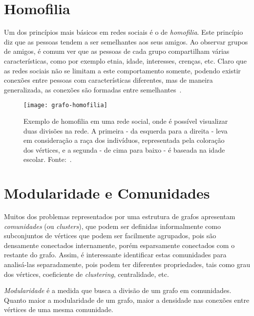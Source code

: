 \section{Homofilia}
\label{conceitos__homofilia}

Um dos princípios mais básicos em redes sociais é o de \emph{homofilia}. Este princípio diz que as pessoas tendem a ser semelhantes aos seus amigos. Ao observar grupos de amigos, é comum ver que as pessoas de cada grupo compartilham várias características, como por exemplo etnia, idade, interesses, crenças, etc. Claro que as redes sociais não se limitam a este comportamento somente, podendo existir conexões entre pessoas com características diferentes, mas de maneira generalizada, as conexões são formadas entre semelhantes~\cite{easley2010networks}.

\begin{figure}[H]
\texttt{[image: grafo-homofilia]}
\centering
\caption{
     Exemplo de homofilia em uma rede social, onde é possível visualizar duas divisões na rede. A primeira - da esquerda para a direita - leva em consideração a raça dos indivíduos, representada pela coloração dos vértices, e a segunda - de cima para baixo - é baseada na idade escolar. Fonte:~\cite{moody2001race}.
}
\label{fig:grafo-homofilia}
\end{figure}

\section{Modularidade e Comunidades}
\label{conceitos__modularidade}

Muitos dos problemas representados por uma estrutura de grafos apresentam \emph{comunidades} (ou \emph{clusters}), que podem ser definidas informalmente como subconjuntos de vértices que podem ser facilmente agrupados, pois são densamente conectados internamente, porém esparsamente conectados com o restante do grafo. Assim, é interessante identificar estas comunidades para analisá-las separadamente, pois podem ter diferentes propriedades, tais como grau dos vértices, coeficiente de \emph{clustering}, centralidade, etc. 

\emph{Modularidade} é a medida que busca a divisão de um grafo em comunidades. Quanto maior a modularidade de um grafo, maior a densidade nas conexões entre vértices de uma mesma comunidade.

